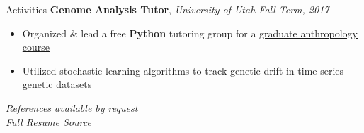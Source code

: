 \documentclass{resume/resume}
\begin{document}
\begin{rSection}{Activities}
    {\bf Genome Analysis Tutor}, {\em University of Utah \hfill Fall Term, 2017}
    \vspace{-6pt}
    \begin{itemize}[nosep]
      \item Organized \& lead a free {\bf Python} tutoring group for a \href{http://content.csbs.utah.edu/~rogers/ant5221/lab/manual.pdf}{graduate anthropology course}
      \item Utilized stochastic learning algorithms to track genetic drift in time-series genetic datasets
    \end{itemize}

\end{rSection}

%
%
%
%
\vspace{1.2em}
\begin{center}
    {\em References available by request} \\
    {\em \href{https://www.overleaf.com/read/dpkcngtfrygt}{Full Resume Source}}
\end{center}
\end{document}
